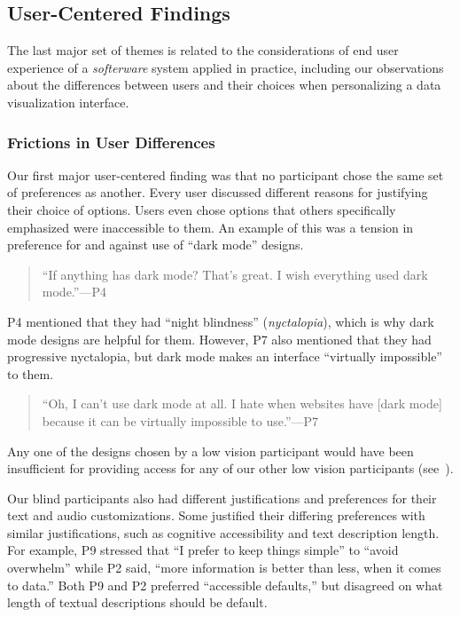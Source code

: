\documentclass[12pt]{cmuthesis}
\begin{document}
\subsection{User-Centered Findings}
The last major set of themes is related to the considerations of end user experience of a \textit{softerware} system applied in practice, including our observations about the differences between users and their choices when personalizing a data visualization interface.

\subsubsection{Frictions in User Differences}
Our first major user-centered finding was that no participant chose the same set of preferences as another. Every user discussed different reasons for justifying their choice of options. Users even chose options that others specifically emphasized were inaccessible to them. An example of this was a tension in preference for and against use of ``dark mode'' designs.

\begin{quote}
    ``If anything has dark mode? That's great. I wish everything used dark mode.''---P4
\end{quote}

P4 mentioned that they had ``night blindness'' (\textit{nyctalopia}), which is why dark mode designs are helpful for them. However, P7 also mentioned that they had progressive nyctalopia, but dark mode makes an interface ``virtually impossible'' to them.

\begin{quote}
    ``Oh, I can't use dark mode at all. I hate when websites have [dark mode] because it can be virtually impossible to use.''---P7
\end{quote}

Any one of the designs chosen by a low vision participant would have been insufficient for providing access for any of our other low vision participants (see~).

Our blind participants also had different justifications and preferences for their text and audio customizations. Some justified their differing preferences with similar justifications, such as cognitive accessibility and text description length. For example, P9 stressed that ``I prefer to keep things simple'' to ``avoid overwhelm'' while P2 said, ``more information is better than less, when it comes to data.'' Both P9 and P2 preferred ``accessible defaults,'' but disagreed on what length of textual descriptions should be default.
\end{document}
